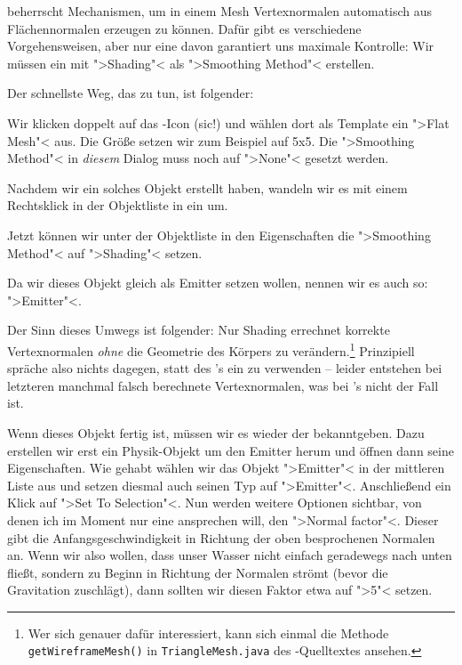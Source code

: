 \documentclass[10pt,DIV=14,a4paper]{scrartcl}
\begin{document}
\aoi beherrscht Mechanismen, um in einem Mesh Vertexnormalen automatisch
aus Flächennormalen erzeugen zu können. Dafür gibt es verschiedene
Vorgehensweisen, aber nur eine davon garantiert uns maximale Kontrolle:
Wir müssen ein \TriMesh mit ">Shading"< als ">Smoothing Method"<
erstellen.

Der schnellste Weg, das zu tun, ist folgender:
\itA
	\item Wir klicken doppelt auf das \PolyMesh-Icon (sic!) und wählen
	dort als Template ein ">Flat Mesh"< aus. Die Größe setzen wir zum
	Beispiel auf 5x5. Die ">Smoothing Method"< in \emph{diesem} Dialog
	muss noch auf ">None"< gesetzt werden.

	\item Nachdem wir ein solches Objekt erstellt haben, wandeln wir es
	mit einem Rechtsklick in der Objektliste in ein \TriMesh um.

	\item Jetzt können wir unter der Objektliste in den Eigenschaften
	die ">Smoothing Method"< auf ">Shading"< setzen.

	\item Da wir dieses Objekt gleich als Emitter setzen wollen, nennen
	wir es auch so: ">Emitter"<.

\itE

Der Sinn dieses Umwegs ist folgender: Nur Shading errechnet korrekte
Vertexnormalen \emph{ohne} die Geometrie des Körpers zu
verändern.\footnote{Wer sich genauer dafür interessiert, kann sich
einmal die Methode \texttt{getWireframeMesh()} in
\texttt{TriangleMesh.java} des \aoi-Quelltextes ansehen.} Prinzipiell
spräche also nichts dagegen, statt des \TriMesh's ein \PolyMesh zu
verwenden -- leider entstehen bei letzteren manchmal falsch berechnete
Vertexnormalen, was bei \TriMesh's nicht der Fall ist.

Wenn dieses Objekt fertig ist, müssen wir es wieder der \fluidsim
bekanntgeben. Dazu erstellen wir erst ein
Physik-Objekt um den Emitter herum und öffnen dann seine Eigenschaften.
Wie gehabt wählen wir das Objekt ">Emitter"< in der mittleren Liste aus
und setzen diesmal auch seinen Typ auf ">Emitter"<. Anschließend ein
Klick auf ">Set To Selection"<. Nun werden weitere Optionen sichtbar,
von denen ich im Moment nur eine ansprechen will, den ">Normal factor"<.
Dieser gibt die Anfangsgeschwindigkeit in Richtung der oben besprochenen
Normalen an.  Wenn wir also wollen, dass unser Wasser nicht einfach
geradewegs nach unten fließt, sondern zu Beginn in Richtung der Normalen
strömt (bevor die Gravitation zuschlägt), dann sollten wir diesen Faktor
etwa auf ">5"< setzen.
\end{document}
